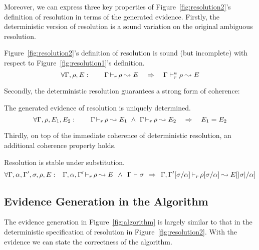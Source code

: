 Moreover, we can express three key properties of Figure~\ref{fig:resolution2}'s
definition of resolution in terms of the generated evidence.
Firstly, the deterministic version of resolution is a sound variation on the original ambiguous resolution.
\begin{lemma}[Soundness]
Figure~\ref{fig:resolution2}'s definition of resolution is sound (but
incomplete) with respect to Figure~\ref{fig:resolution1}'s definition.
\[\forall \Gamma, \rho, E: \quad\quad \Gamma \mathop{\vdash_{r}} \rho \leadsto E \quad\Rightarrow\quad \Gamma \vdash^a_{r} \rho \leadsto E \]
\end{lemma}
Secondly, the deterministic resolution guarantees a strong form of coherence:
\begin{lemma}[Determinacy]
The generated evidence of resolution is uniquely determined.
\[\forall \Gamma, \rho, E_1, E_2: \quad\quad \Gamma \mathop{\vdash_{r}} \rho \leadsto E_1 ~\wedge~ \Gamma \mathop{\vdash_{r}} \rho \leadsto E_2 \quad\Rightarrow\quad E_1 = E_2 \]
\end{lemma}
Thirdly, on top of the immediate coherence of deterministic resolution, 
an additional coherence property holds.  
\begin{lemma}[Stability]
Resolution is stable under substitution.
\[\forall \Gamma,\alpha,\Gamma',\sigma,\rho, E: \hskip4.5pt\
\Gamma,\alpha,\Gamma' \mathop{\vdash_{r}} \rho \leadsto E \hskip4.5pt\wedge\hskip4.5pt \Gamma \vdash \sigma
\hskip4.5pt\Rightarrow\hskip4.5pt 
\Gamma,\Gamma'[\sigma/\alpha] \mathop{\vdash_{r}} \rho[\sigma/\alpha] \leadsto E[|\sigma|/\alpha] \]
\end{lemma}

\subsection{Evidence Generation in the Algorithm}

The evidence generation in Figure~\ref{fig:algorithm} is largely similar to
that in the deterministic specification of resolution in
Figure~\ref{fig:resolution2}.
With the evidence we can state the correctness of the algorithm.

